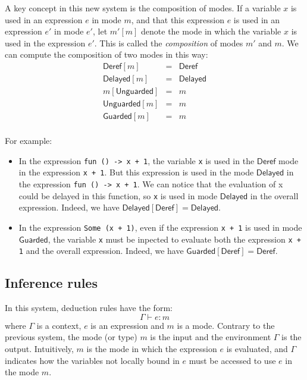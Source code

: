 \documentclass{article}
\newcommand{\Deref}{\mathsf{Deref}}
\newcommand{\Unguarded}{\mathsf{Unguarded}}
\newcommand{\Guarded}{\mathsf{Guarded}}
\newcommand{\Delayed}{\mathsf{Delayed}}
\begin{document}
A key concept in this new system is the composition of modes. If a variable $x$
is used in an expression $e$ in mode $m$, and that this expression $e$ is used
in an expression $e'$ in mode $e'$, let $m'[m]$ denote the mode in which the
variable $x$ is used in the expression $e'$. This is called the
\textit{composition} of modes $m'$ and $m$.  We can compute the composition of two modes in this way: \begin{displaymath} \begin{array}{lll} \Deref [m]     & = & \Deref   \\
    \Delayed [m]   & = & \Delayed \\
    m[\Unguarded]  & = & m        \\
    \Unguarded [m] & = & m        \\
    \Guarded [m]   & = & m        \\
  \end{array}
\end{displaymath}

For example:
\begin{itemize}
  \item In the expression \lstinline|fun () -> x + 1|, the variable
    \lstinline|x| is used in the $\Deref$ mode in the expression
    \lstinline|x + 1|. But this expression is used in the mode $\Delayed$ in the
    expression \lstinline|fun () -> x + 1|. We can notice that the evaluation of
    x could be delayed in this function, so \lstinline|x| is used in mode
    $\Delayed$ in the overall expression. Indeed, we have
    $\Delayed [\Deref] = \Delayed$.

  \item In the expression \lstinline|Some (x + 1)|, even if the expression
    \lstinline|x + 1| is used in mode $\Guarded$, the variable \lstinline|x|
    must be inpected to evaluate both the expression \lstinline|x + 1| and the
    overall expression. Indeed, we have $\Guarded [\Deref] = \Deref$.
\end{itemize}

\subsection{Inference rules}
In this system, deduction rules have the form:
$$\Gamma \vdash e: m$$
where $\Gamma$ is a context, $e$ is an expression and $m$ is a mode.
Contrary to the previous system, the mode (or type) $m$ is the input and the
environment $\Gamma$ is the output. Intuitively, $m$ is the mode in which the
expression $e$ is evaluated, and $\Gamma$ indicates how the variables not
locally bound in $e$ must be accessed to use $e$ in the mode $m$.
\end{document}
